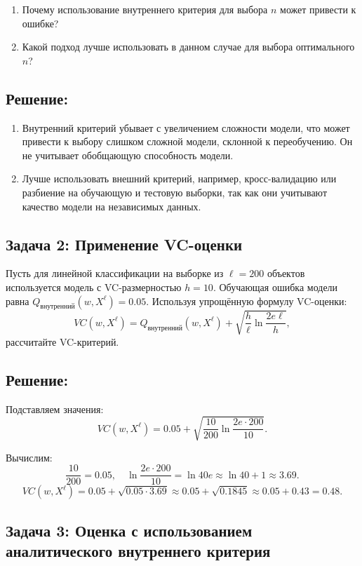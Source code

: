 \begin{enumerate}
    \item Почему использование внутреннего критерия для выбора $n$ может привести к ошибке?
    \item Какой подход лучше использовать в данном случае для выбора оптимального $n$?
\end{enumerate}

\subsection*{Решение:}

\begin{enumerate}
    \item Внутренний критерий убывает с увеличением сложности модели, что может привести к выбору слишком сложной модели, склонной к переобучению. Он не учитывает обобщающую способность модели.
    \item Лучше использовать внешний критерий, например, кросс-валидацию или разбиение на обучающую и тестовую выборки, так как они учитывают качество модели на независимых данных.
\end{enumerate}


\subsection*{Задача 2: Применение VC-оценки}

Пусть для линейной классификации на выборке из $\ell = 200$ объектов используется модель с VC-размерностью $h = 10$. Обучающая ошибка модели равна $Q_{\text{внутренний}}(w, X^\ell) = 0.05$. Используя упрощённую формулу VC-оценки:
\[
    VC(w, X^\ell) = Q_{\text{внутренний}}(w, X^\ell) + \sqrt{\frac{h}{\ell} \ln \frac{2e\ell}{h}},
\]
рассчитайте VC-критерий.

\subsection*{Решение:}

Подставляем значения:
\[
    VC(w, X^\ell) = 0.05 + \sqrt{\frac{10}{200} \ln \frac{2e \cdot 200}{10}}.
\]

Вычислим:
\[
    \frac{10}{200} = 0.05, \quad \ln \frac{2e \cdot 200}{10} = \ln 40e \approx \ln 40 + 1 \approx 3.69.
\]
\[
    VC(w, X^\ell) = 0.05 + \sqrt{0.05 \cdot 3.69} \approx 0.05 + \sqrt{0.1845} \approx 0.05 + 0.43 = 0.48.
\]


\subsection*{Задача 3: Оценка с использованием аналитического внутреннего критерия}

